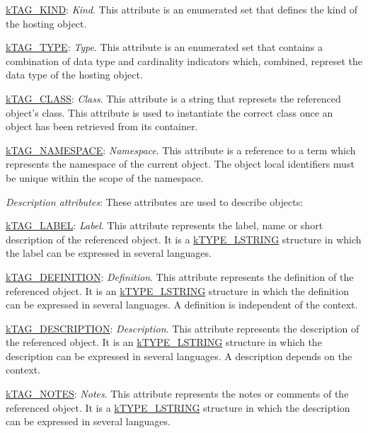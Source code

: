 \begin{DoxyItemize}
\begin{DoxyItemize}
\item {\ttfamily \hyperlink{}{k\-T\-A\-G\-\_\-\-K\-I\-N\-D}}\-: {\itshape Kind}. This attribute is an enumerated set that defines the kind of the hosting object. 
\item {\ttfamily \hyperlink{}{k\-T\-A\-G\-\_\-\-T\-Y\-P\-E}}\-: {\itshape Type}. This attribute is an enumerated set that contains a combination of data type and cardinality indicators which, combined, represet the data type of the hosting object. 
\item {\ttfamily \hyperlink{}{k\-T\-A\-G\-\_\-\-C\-L\-A\-S\-S}}\-: {\itshape Class}. This attribute is a string that represets the referenced object's class. This attribute is used to instantiate the correct class once an object has been retrieved from its container. 
\item {\ttfamily \hyperlink{}{k\-T\-A\-G\-\_\-\-N\-A\-M\-E\-S\-P\-A\-C\-E}}\-: {\itshape Namespace}. This attribute is a reference to a term which represents the namespace of the current object. The object local identifiers must be unique within the scope of the namespace. 
\end{DoxyItemize}
\item {\itshape Description attributes}\-: These attributes are used to describe objects\-: 
\begin{DoxyItemize}
\item {\ttfamily \hyperlink{}{k\-T\-A\-G\-\_\-\-L\-A\-B\-E\-L}}\-: {\itshape Label}. This attribute represents the label, name or short description of the referenced object. It is a \hyperlink{}{k\-T\-Y\-P\-E\-\_\-\-L\-S\-T\-R\-I\-N\-G} structure in which the label can be expressed in several languages. 
\item {\ttfamily \hyperlink{}{k\-T\-A\-G\-\_\-\-D\-E\-F\-I\-N\-I\-T\-I\-O\-N}}\-: {\itshape Definition}. This attribute represents the definition of the referenced object. It is an \hyperlink{}{k\-T\-Y\-P\-E\-\_\-\-L\-S\-T\-R\-I\-N\-G} structure in which the definition can be expressed in several languages. A definition is independent of the context. 
\item {\ttfamily \hyperlink{}{k\-T\-A\-G\-\_\-\-D\-E\-S\-C\-R\-I\-P\-T\-I\-O\-N}}\-: {\itshape Description}. This attribute represents the description of the referenced object. It is an \hyperlink{}{k\-T\-Y\-P\-E\-\_\-\-L\-S\-T\-R\-I\-N\-G} structure in which the description can be expressed in several languages. A description depends on the context. 
\item {\ttfamily \hyperlink{}{k\-T\-A\-G\-\_\-\-N\-O\-T\-E\-S}}\-: {\itshape Notes}. This attribute represents the notes or comments of the referenced object. It is a \hyperlink{}{k\-T\-Y\-P\-E\-\_\-\-L\-S\-T\-R\-I\-N\-G} structure in which the description can be expressed in several languages. 

\end{DoxyItemize}
\end{DoxyItemize}
